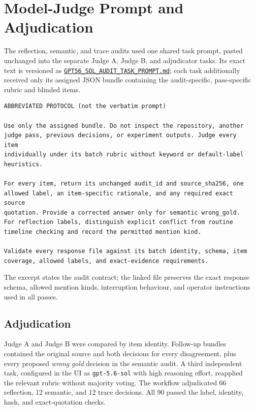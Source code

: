 \documentclass[conference]{IEEEtran}
\begin{document}
\section{Model-Judge Prompt and Adjudication}
\label{app:model-judge-audits}

The reflection, semantic, and trace audits used one shared task prompt, pasted unchanged into the separate Judge A, Judge B, and adjudicator tasks. Its exact text is versioned as
\href{https://github.com/thestbobo/tiser_temporal_reasoning_extension/blob/main/docs/GPT56_SOL_AUDIT_TASK_PROMPT.md}{\texttt{GPT56\_SOL\_AUDIT\_TASK\_PROMPT.md}}; each task additionally received only its assigned JSON bundle containing the audit-specific, pass-specific rubric and blinded items.

\begin{lstlisting}[style=prompt]
ABBREVIATED PROTOCOL (not the verbatim prompt)

Use only the assigned bundle. Do not inspect the repository, another
judge pass, previous decisions, or experiment outputs. Judge every item
individually under its batch rubric without keyword or default-label
heuristics.

For every item, return its unchanged audit_id and source_sha256, one
allowed label, an item-specific rationale, and any required exact source
quotation. Provide a corrected answer only for semantic wrong_gold.
For reflection labels, distinguish explicit conflict from routine
timeline checking and record the permitted mention kind.

Validate every response file against its batch identity, schema, item
coverage, allowed labels, and exact-evidence requirements.
\end{lstlisting}

The excerpt states the audit contract; the linked file preserves the exact response schema, allowed mention kinds, interruption behaviour, and operator instructions used in all passes.
\subsection{Adjudication}

Judge A and Judge B were compared by item identity. Follow-up bundles contained
the original source and both decisions for every disagreement, plus every proposed
\emph{wrong gold} decision in the semantic audit. A third independent task,
configured in the UI as \texttt{gpt-5.6-sol} with high reasoning effort,
reapplied the relevant rubric without majority voting. The workflow adjudicated
66 reflection, 12 semantic, and 12 trace decisions. All 90 passed the label,
identity, hash, and exact-quotation checks.
\end{document}
